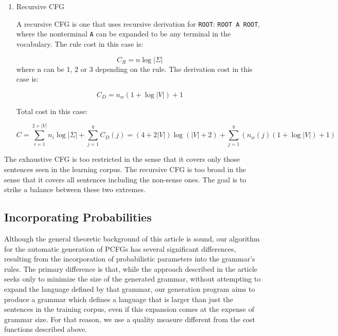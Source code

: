 \documentclass[paper=a4, fontsize=11pt]{scrartcl} %
\numberwithin{equation}{section} %
\numberwithin{figure}{section} %
\numberwithin{table}{section} %
\begin{document}
\begin{enumerate}[1.]
\item Recursive CFG

A recursive CFG is one that uses recursive derivation for \texttt{ROOT}: \texttt{ROOT \textrightarrow A ROOT}, where the nonterminal \texttt{A} can be expanded to be any terminal in the vocabulary.
The rule cost in this case is:

\begin{equation}\label{first}
C_R = n \log \lvert \Sigma \rvert
\end{equation}
where n can be 1, 2 or 3 depending on the rule.
The derivation cost in this case is:

\begin{equation}\label{first}
C_D = n_w(1 + \log \lvert V \rvert) + 1
\end{equation}

Total cost in this case:

\begin{equation}\label{first}
C = \sum \limits_{i=1}^{2+\lvert V \rvert}n_i \log \lvert \Sigma \rvert + \sum \limits_{j=1}^q C_D(j) = (4 + 2\lvert V \rvert) \log(\lvert V \rvert + 2) + \sum \limits_{j=1}^q (n_w(j)(1 + \log \lvert V \rvert) + 1)
\end{equation}

\end{enumerate}

The exhaustive CFG is too restricted in the sense that it covers only those sentences seen in the learning corpus. The recursive CFG is too broad in the sense that it covers all sentences including the non-sense ones. The goal is to strike a balance between these two extremes.

\subsection{Incorporating Probabilities}
Although the general theoretic background of this article is sound, our algorithm for the automatic generation of PCFGs has several significant differences, resulting from the incorporation of probabilistic parameters into the grammar's rules. The primary difference is that, while the approach described in the article seeks only to minimize the size of the generated grammar, without attempting to expand the language defined by that grammar, our generation program aims to produce a grammar which defines a language that is larger than just the sentences in the training corpus, even if this expansion comes at the expense of grammar size. For that reason, we use a quality measure different from the cost functions described above.
\end{document}
